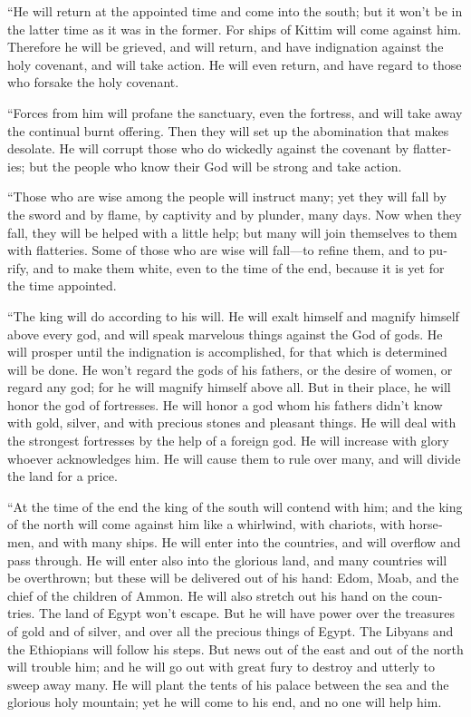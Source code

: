 \begin{paracol}{2}
\begin{otherlanguage}{english}
 ``He will return at the appointed time and come into the
south; but it won't be in the latter time as it was in the former.
 For ships of Kittim will come against him. Therefore he
will be grieved, and will return, and have indignation against the holy
covenant, and will take action. He will even return, and have regard to
those who forsake the holy covenant.

 ``Forces from him will profane the sanctuary, even the
fortress, and will take away the continual burnt offering. Then they
will set up the abomination that makes desolate.  He will
corrupt those who do wickedly against the covenant by flatteries; but
the people who know their God will be strong and take action.

 ``Those who are wise among the people will instruct
many; yet they will fall by the sword and by flame, by captivity and by
plunder, many days.  Now when they fall, they will be
helped with a little help; but many will join themselves to them with
flatteries.  Some of those who are wise will fall---to
refine them, and to purify, and to make them white, even to the time of
the end, because it is yet for the time appointed.

 ``The king will do according to his will. He will exalt
himself and magnify himself above every god, and will speak marvelous
things against the God of gods. He will prosper until the indignation is
accomplished, for that which is determined will be done. 
He won't regard the gods of his fathers, or the desire of women, or
regard any god; for he will magnify himself above all. 
But in their place, he will honor the god of fortresses. He will honor a
god whom his fathers didn't know with gold, silver, and with precious
stones and pleasant things.  He will deal with the
strongest fortresses by the help of a foreign god. He will increase with
glory whoever acknowledges him. He will cause them to rule over many,
and will divide the land for a price.

 ``At the time of the end the king of the south will
contend with him; and the king of the north will come against him like a
whirlwind, with chariots, with horsemen, and with many ships. He will
enter into the countries, and will overflow and pass through.
 He will enter also into the glorious land, and many
countries will be overthrown; but these will be delivered out of his
hand: Edom, Moab, and the chief of the children of Ammon.
 He will also stretch out his hand on the countries. The
land of Egypt won't escape.  But he will have power over
the treasures of gold and of silver, and over all the precious things of
Egypt. The Libyans and the Ethiopians will follow his steps.
 But news out of the east and out of the north will
trouble him; and he will go out with great fury to destroy and utterly
to sweep away many.  He will plant the tents of his
palace between the sea and the glorious holy mountain; yet he will come
to his end, and no one will help him.


\end{otherlanguage}
\end{paracol}
